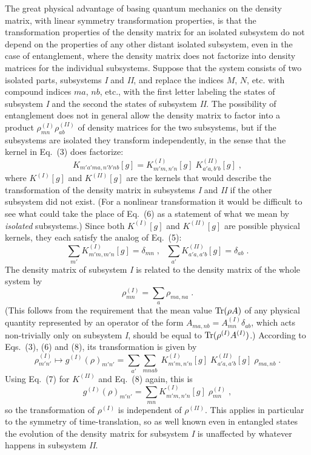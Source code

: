 \documentclass[12pt]{article}
\begin{document}
The great physical advantage of basing quantum mechanics on the density matrix, with linear symmetry transformation properties, is that the transformation properties of the density matrix for an isolated subsystem do not depend on the properties of any other distant isolated subsystem, even in the case of entanglement, where the density matrix does not factorize into density matrices for the individual subsystems.  Suppose that the system consists of two isolated parts, subsystems {\em I} and {\em II}, and replace the indices $M$, $N$, etc. with compound indices $ma$, $nb$, etc.,  with the first letter labeling  the states of subsystem {\em I} and the second the states of subsystem {\em II}.  The possibility of entanglement does not in general allow the density matrix to factor into a product $\rho^{(I)}_{mn}\rho^{(II)}_{ab}$ of density matrices for the two subsystems, but if the subsystems are isolated they transform independently, in the sense that the kernel in Eq.~(3) does factorize:
\begin{equation}
K_{m'a'ma,n'b'nb}[g]=K^{(I)}_{m'm,n'n}[g]\;K^{(II)}_{a'a,b'b}[g]\;,
\end{equation}
where $K^{(I)}[g]$ and $K^{(II)}[g]$ are the kernels that would describe the transformation of the density matrix in subsystems {\em I} and {\em II} if the other subsystem did not exist.  
(For a nonlinear transformation it would be  difficult to see what could take the place of Eq.~(6) as a statement of   what we mean by {\em isolated} subsystems.)
Since both $K^{(I)}[g]$ and $K^{(II)}[g]$ are possible physical kernels, they each satisfy the analog of Eq.~(5):
\begin{equation}
\sum_{m'}K^{(I)}_{m'm,m'n}[g]=\delta_{mn}\;,~~~\sum_{a'} K^{(II)}_{a'a,a'b}[g] =\delta_{ab}\;.
\end{equation}
  The density matrix of subsystem {\em I} is related to the density matrix of the whole system by
\begin{equation}
\rho_{mn}^{(I)}=\sum_a\rho_{ma,na}\;.
\end{equation}
(This follows from the requirement that the mean value ${\rm Tr}(\rho A)$ of any physical quantity represented by an operator of the form $A_{ma,nb}=A^{(I)}_{mn}\delta_{ab}$, which acts non-trivially only on subsystem {\em I}, should be equal to ${\rm Tr}(\rho^{(I)} A^{(I)})$.)
According to Eqs.~(3), (6) and (8), its transformation is given by
$$
\rho_{m'n'}^{(I)}\mapsto g^{(I)}(\rho)_{m'n'}=\sum_{a'}\sum_{mnab}\;K^{(I)}_{m'm,n'n}[g]\;K^{(II)}_{a'a,a'b}[g]\;\rho_{ma,nb}\;.
$$
Using Eq.~(7) for $K^{(II)}$ and Eq.~(8) again, this is
\begin{equation}
g^{(I)}(\rho)_{m'n'}=\sum_{mn}K^{(I)}_{m'm,n'n}[g]\;\rho_{mn}^{(I)}\;,
\end{equation}
so the transformation of $\rho^{(I)}$ is independent of $\rho^{(II)}$.  
This applies in particular to the symmetry of time-translation, so as well known even in entangled states the evolution of the density matrix for subsystem {\em I} is unaffected by whatever happens in subsystem {\em II}.
\end{document}
